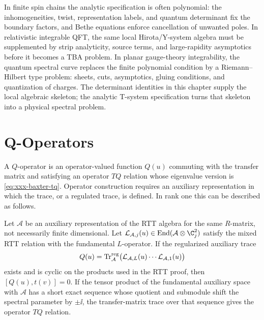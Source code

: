 In finite spin chains the analytic specification is often polynomial: the
inhomogeneities, twist, representation labels, and quantum determinant fix
the boundary factors, and Bethe equations enforce cancellation of unwanted
poles.  In relativistic integrable QFT, the same local Hirota/Y-system
algebra must be supplemented by strip analyticity, source terms, and
large-rapidity asymptotics before it becomes a TBA problem.  In planar
gauge-theory integrability, the quantum spectral curve replaces the finite
polynomial condition by a Riemann--Hilbert type problem: sheets, cuts,
asymptotics, gluing conditions, and quantization of charges.  The determinant
identities in this chapter supply the local algebraic skeleton; the analytic
T-system specification turns that skeleton into a physical spectral problem.

\section{Q-Operators}

A \(Q\)-operator is an operator-valued function \(Q(u)\) commuting with the
transfer matrix and satisfying an operator \(TQ\) relation whose eigenvalue
version is \eqref{eq:xxx-baxter-tq}.  Operator construction requires an
auxiliary representation in which the trace, or a regulated trace, is
defined.  In rank one this can be described as follows.

\begin{construction}
\label{con:rank-one-q-operator-datum}
Let \(\mathcal A\) be an auxiliary representation of the RTT algebra for the
same \(R\)-matrix, not necessarily finite dimensional.  Let
\(\mathcal L_{\mathcal A,j}(u)\in
\operatorname{End}(\mathcal A\otimes\C^2_j)\) satisfy the mixed RTT relation
with the fundamental \(L\)-operator.  If the regularized auxiliary trace
\[
  Q(u)=\operatorname{Tr}_{\mathcal A}^{\rm reg}
  \bigl(
    \mathcal L_{\mathcal A,L}(u)\cdots
    \mathcal L_{\mathcal A,1}(u)
  \bigr)
\]
exists and is cyclic on the products used in the RTT proof, then
\([Q(u),t(v)]=0\).  If the tensor product of the fundamental auxiliary space
with \(\mathcal A\) has a short exact sequence whose quotient and submodule
shift the spectral parameter by \(\pm\ii\), the transfer-matrix trace over
that sequence gives the operator \(TQ\) relation.
\end{construction}

